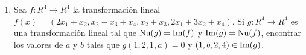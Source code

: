 \documentclass[../practica.root.tex]{subfiles}
\begin{document}
\begin{enumerate}


    \item Sea $f : R^4 \to R^4$ la transformación lineal $f(x) = (2x_1 + x_2, x_2 - x_3 + x_4, x_2 + x_3, 2x_1 + 3x_2 + x_4)$. Si $g : R^4 \to R^4$ es una transformación lineal tal que $\operatorname{Nu}(g) = \operatorname{Im}(f)$ y $\operatorname{Im}(g) = \operatorname{Nu}(f)$, encontrar los valores de $a$ y $b$ tales que $g(1, 2, 1, a) = 0$ y $(1, b, 2, 4) \in \operatorname{Im}(g)$.


\end{enumerate}
\end{document}
